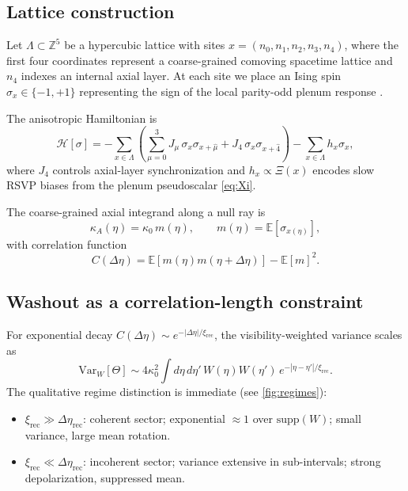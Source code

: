 \documentclass[12pt]{article}
\theoremstyle{definition}
\newcommand{\kA}{\kappa_A}
\newcommand{\Wrec}{\Delta\eta_{\mathrm{rec}}}
\newcommand{\xirec}{\xi_{\mathrm{rec}}}
\newcommand{\VarW}{\mathrm{Var}_W}
\begin{document}
\subsection{Lattice construction}

Let $\Lambda\subset\mathbb{Z}^5$ be a hypercubic lattice with sites
$x=(n_0,n_1,n_2,n_3,n_4)$, where the first four coordinates represent
a coarse-grained comoving spacetime lattice and $n_4$ indexes an
internal axial layer.
At each site we place an Ising spin
$\sigma_x\in\{-1,+1\}$ representing the sign of the local
parity-odd plenum response \cite{Ising1925,Onsager1944}.

The anisotropic Hamiltonian is
\begin{equation}
  \mathcal{H}[\sigma]
  = -\sum_{x\in\Lambda}
    \left(
      \sum_{\mu=0}^{3} J_\mu\,\sigma_x\sigma_{x+\hat\mu}
      + J_4\,\sigma_x\sigma_{x+\hat4}
    \right)
  -\sum_{x\in\Lambda} h_x\sigma_x,
  \label{eq:Ising_H}
\end{equation}
where $J_4$ controls axial-layer synchronization and
$h_x\propto\Xi(x)$ encodes slow RSVP biases from the plenum
pseudoscalar \eqref{eq:Xi}.

The coarse-grained axial integrand along a null ray is
\begin{equation}
  \kA(\eta) = \kappa_0\,m(\eta),
  \qquad
  m(\eta) = \mathbb{E}[\sigma_{x(\eta)}],
\end{equation}
with correlation function
\begin{equation}
  C(\Delta\eta) = \mathbb{E}[m(\eta)m(\eta+\Delta\eta)]
                - \mathbb{E}[m]^2.
\end{equation}

\subsection{Washout as a correlation-length constraint}

For exponential decay $C(\Delta\eta)\sim e^{-|\Delta\eta|/\xirec}$,
the visibility-weighted variance scales as
\begin{equation}
  \VarW[\Theta]
  \sim 4\kappa_0^2
       \int d\eta\,d\eta'\,W(\eta)W(\eta')\,
       e^{-|\eta-\eta'|/\xirec}.
  \label{eq:Var_xi}
\end{equation}
The qualitative regime distinction is immediate (see \cref{fig:regimes}):
\begin{itemize}[nosep]
  \item $\xirec\gg\Wrec$: coherent sector; exponential $\approx1$ over
        $\mathrm{supp}(W)$; small variance, large mean rotation.
  \item $\xirec\ll\Wrec$: incoherent sector; variance extensive in
        sub-intervals; strong depolarization, suppressed mean.
\end{itemize}
\end{document}
